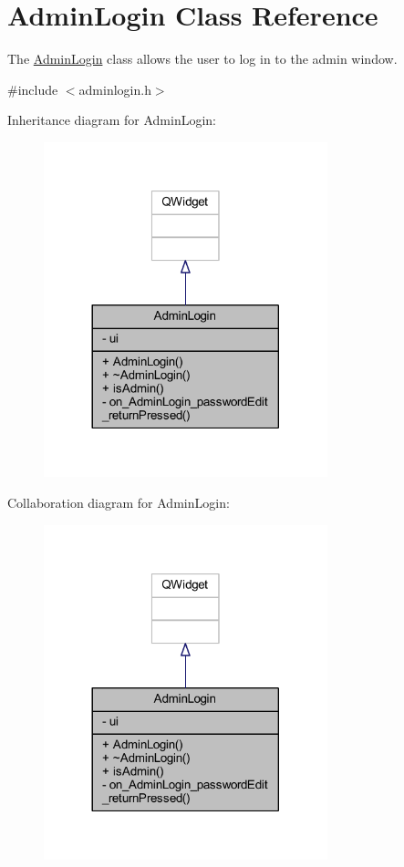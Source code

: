 \hypertarget{class_admin_login}{}\section{Admin\+Login Class Reference}
\label{class_admin_login}


The \hyperlink{class_admin_login}{Admin\+Login} class allows the user to log in to the admin window.  




{\ttfamily \#include $<$adminlogin.\+h$>$}



Inheritance diagram for Admin\+Login\+:
\nopagebreak
\begin{figure}[H]
\begin{center}
\leavevmode
\includegraphics[width=233pt]{class_admin_login__inherit__graph}
\end{center}
\end{figure}


Collaboration diagram for Admin\+Login\+:
\nopagebreak
\begin{figure}[H]
\begin{center}
\leavevmode
\includegraphics[width=233pt]{class_admin_login__coll__graph}
\end{center}
\end{figure}
